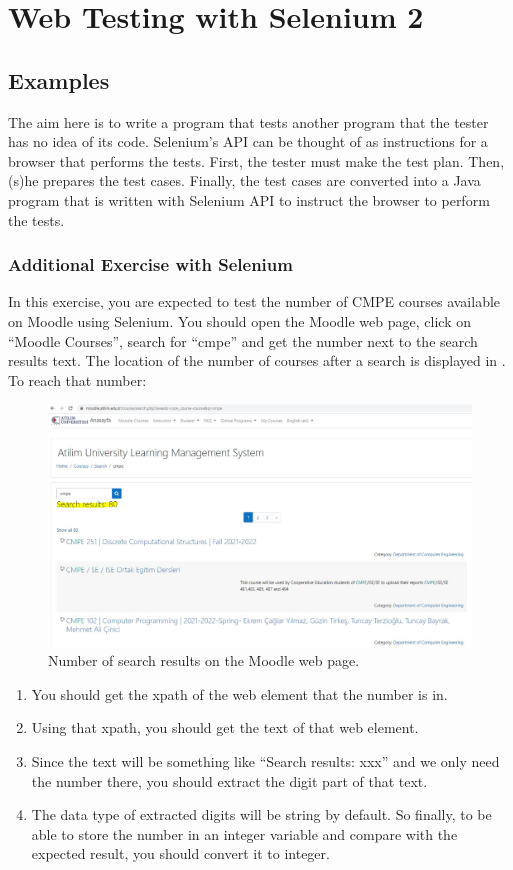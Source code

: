 \chapter{Web Testing with Selenium 2}

\section{Examples}
The aim here is to write a program that tests another program that the tester has no idea of its code. Selenium's API can be thought of as instructions for a browser that performs the tests. First, the tester must make the test plan. Then, (s)he prepares the test cases. Finally, the test cases are converted into a Java program that is written with Selenium API to instruct the browser to perform the tests.

\subsection{Additional Exercise with Selenium}
In this exercise, you are expected to test the number of CMPE courses available on Moodle using Selenium. You should open the Moodle web page, click on “Moodle Courses”, search for “cmpe” and get the number next to the search results text. The location of the number of courses after a search is displayed in . To reach that number:

\begin{figure}
    \includegraphics{images/selenium1-detailed-install-3.jpg}
    \caption{Number of search results on the Moodle web page.}
\end{figure}

\begin{enumerate}
    \item You should get the xpath of the web element that the number is in.
    \item Using that xpath, you should get the text of that web element.
    \item Since the text will be something like “Search results: xxx” and we only need the number there, you should extract the digit part of that text.
    \item The data type of extracted digits will be string by default. So finally, to be able to store the number in an integer variable and compare with the expected result, you should convert it to integer.
\end{enumerate}

